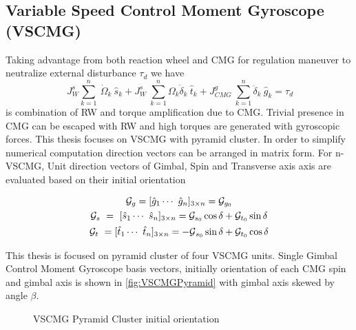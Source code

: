 \subsection{Variable Speed Control Moment Gyroscope (VSCMG)}

Taking advantage from both reaction wheel and CMG for regulation maneuver to neutralize external disturbance $\displaystyle \tau _{d}$ we have
\begin{equation}
\ J^{s}_{W}\sum ^{n}_{k=1} \ \dot{\Omega }_{k} \ \hat{s}_{k} +J^{s}_{W} \ \sum ^{n}_{k=1} \Omega _{k}\dot{\delta}_{k} \ \hat{t}_{k} +J^{g}_{CMG} \ \sum ^{n}_{k=1}\ddot{\delta}_{k} \ \hat{g}_{k} =\tau _{d}
\end{equation}
is combination of RW and torque amplification due to CMG. Trivial presence in CMG can be escaped with RW and high torques are generated with gyroscopic forces. This thesis focuses on VSCMG with pyramid cluster. In order to simplify numerical computation direction vectors can be arranged in matrix form. For n-VSCMG, Unit direction vectors of Gimbal, Spin and Transverse axis axis are evaluated based on their initial orientation

\begin{gather}
\mathcal{G}_{g} =[\hat{g}_{1} \cdots \ \hat{g}_{n}]_{3\times n} =\mathcal{G}_{g_0} \notag\\
\mathcal{G}_{s} \ =\ [\hat{s}_{1} \cdots \ \hat{s}_{n}]_{3\times n} =\mathcal{G}_{s_0}\cos \delta +\mathcal{G}_{t_0}\sin \delta  \notag\\
\mathcal{G}_{t} \ =[\hat{t}_{1} \cdots \ \hat{t}_{n}]_{3\times n} =\mathcal{- G}_{s_0}\sin \delta +\mathcal{G}_{t_0}\cos \delta 
\end{gather}

This thesis is focused on pyramid cluster of four VSCMG units. Single Gimbal Control Moment Gyroscope basis vectors, initially orientation of each CMG spin and gimbal axis is shown in \autoref{fig:VSCMGPyramid} with gimbal axis skewed by angle $\beta$.


\begin{figure}[h]
\centering

\caption{VSCMG Pyramid Cluster initial orientation}
\label{fig:VSCMGPyramid}
\end{figure}

